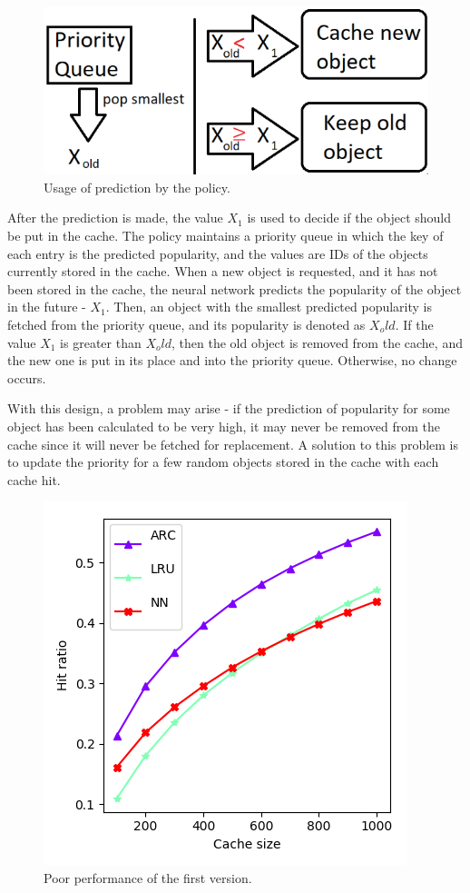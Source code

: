 \begin{figure}[t!]
	\centering
	\includegraphics[width=0.75\linewidth]{pics/cache2.png}
	\caption{Usage of prediction by the policy.}
	\label{fig:cache2}
\end{figure}

After the prediction is made, the value $X_1$ is used to decide if the object should be put in the cache. The policy maintains a priority queue in which the key of each entry is the predicted popularity, and the values are IDs of the objects currently stored in the cache. When a new object is requested, and it has not been stored in the cache, the neural network predicts the popularity of the object in the future - $X_1$. Then, an object with the smallest predicted popularity is fetched from the priority queue, and its popularity is denoted as $X_old$. If the value $X_1$ is greater than $X_old$, then the old object is removed from the cache, and the new one is put in its place and into the priority queue. Otherwise, no change occurs. 

With this design, a problem may arise - if the prediction of popularity for some object has been calculated to be very high, it may never be removed from the cache since it will never be fetched for replacement. A solution to this problem is to update the priority for a few random objects stored in the cache with each cache hit.

\begin{figure}[t!]
	\centering
	\includegraphics[width=0.5\linewidth]{pics/cache3.png}
	\caption{Poor performance of the first version.}
	\label{fig:cache3}
\end{figure}

